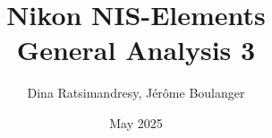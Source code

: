 \documentclass[a4paper,DIV=17,dvipsnames,headsepline]{scrartcl}
\title{Nikon NIS-Elements\\ General Analysis 3}
\author{Dina Ratsimandresy, Jérôme Boulanger}
\date{May 2025}
\begin{document}
\maketitle


 
\newpage

\newpage

\newpage

% 
% 
% 
% 

\appendix
\printendnotes
\end{document}
